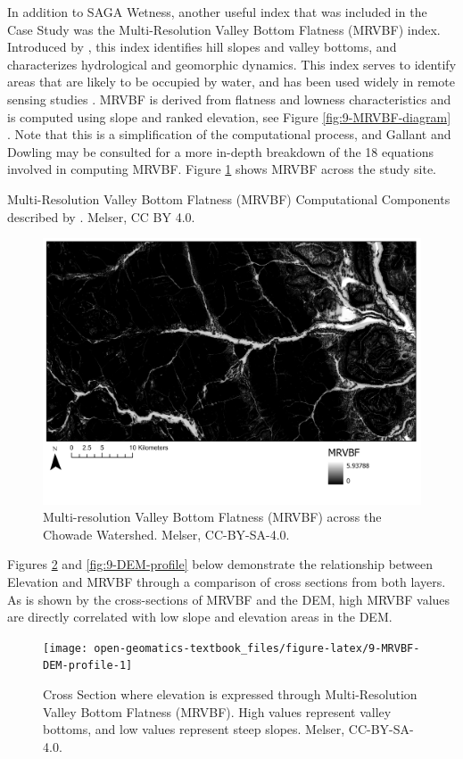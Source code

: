 \documentclass[
]{book}
\begin{document}
In addition to SAGA Wetness, another useful index that was included in the Case Study was the Multi-Resolution Valley Bottom Flatness (MRVBF) index. Introduced by \citep{gallant_multiresolution_2003}, this index identifies hill slopes and valley bottoms, and characterizes hydrological and geomorphic dynamics. This index serves to identify areas that are likely to be occupied by water, and has been used widely in remote sensing studies \citep{huang_comparison_2017}. MRVBF is derived from flatness and lowness characteristics and is computed using slope and ranked elevation, see Figure \ref{fig:9-MRVBF-diagram} \citep{gallant_multiresolution_2003}. Note that this is a simplification of the computational process, and Gallant and Dowling may be consulted for a more in-depth breakdown of the 18 equations involved in computing MRVBF. Figure \ref{fig:9-MRVBF} shows MRVBF across the study site.

\label{fig:9-MRVBF-diagram}Multi-Resolution Valley Bottom Flatness (MRVBF) Computational Components described by \citet{gallant_multiresolution_2003}. Melser, CC BY 4.0.

\begin{figure}
\includegraphics[width=0.75\linewidth]{images/09-MRVBF} \caption{Multi-resolution Valley Bottom Flatness (MRVBF) across the Chowade Watershed. Melser, CC-BY-SA-4.0.}\label{fig:9-MRVBF}
\end{figure}

Figures \ref{fig:9-MRVBF-DEM-profile} and \ref{fig:9-DEM-profile} below demonstrate the relationship between Elevation and MRVBF through a comparison of cross sections from both layers. As is shown by the cross-sections of MRVBF and the DEM, high MRVBF values are directly correlated with low slope and elevation areas in the DEM.

\begin{figure}
\texttt{[image: open-geomatics-textbook\_files/figure-latex/9-MRVBF-DEM-profile-1]} \caption{Cross Section where elevation is expressed through Multi-Resolution Valley Bottom Flatness (MRVBF). High values represent valley bottoms, and low values represent steep slopes. Melser, CC-BY-SA-4.0.}\label{fig:9-MRVBF-DEM-profile}
\end{figure}
\end{document}
